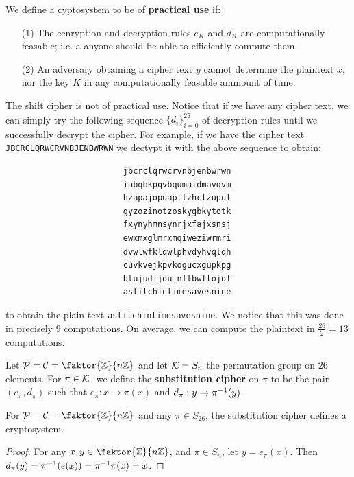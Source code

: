\begin{definition}
    We define a cyptosystem to be of \textbf{practical use} if:
    \begin{enumerate}
        \item[(1)] The ecnryption and decryption rules $e_K$ and  $d_K$ are
            computationally feasable; i.e. a anyone should be able to
            efficiently compute them.

        \item [(2)] An adversary obtaining a cipher text $y$ cannot determine
            the plaintext $x$, nor the key  $K$ in any computationally feasable
            ammount of time.
    \end{enumerate}
\end{definition}

\begin{example}
    The shift cipher is not of practical use. Notice that if we have any cipher
    text, we can simply try the following sequence $\{d_i\}_{i=0}^{25}$ of
    decryption rules until we successfully decrypt the cipher. For example, if
    we have the cipher text \lstinline{JBCRCLQRWCRVNBJENBWRWN} we dectypt it
    with the above sequence to obtain:
    \begin{verbatim}
                        jbcrclqrwcrvnbjenbwrwn
                        iabqbkpqvbqumaidmavqvm
                        hzapajopuaptlzhclzupul
                        gyzozinotzoskygbkytotk
                        fxynyhmnsynrjxfajxsnsj
                        ewxmxglmrxmqiweziwrmri
                        dvwlwfklqwlphvdyhvqlqh
                        cuvkvejkpvkogucxgupkpg
                        btujudijoujnftbwftojof
                        astitchintimesavesnine
    \end{verbatim}
    to obtain the plain text \lstinline{astitchintimesavesnine}. We notice that
    this was done in precisely $9$ computations. On average, we can compute the
    plaintext in $\frac{26}{2}=13$ computations.
\end{example}

\begin{definition}
    Let $\Pc=\Cc=\faktor{\Z}{n\Z}$ and let $\mathcal{K}=S_n$ the permutation group
    on $26$ elements. For $\pi \in \mathcal{K}$, we define the  \textbf{substitution
    cipher} on $\pi$ to be the pair $(e_{\pi}, d_{\pi})$ such that
    $e_{\pi}:x \rightarrow \pi(x)$ and $d_{\pi}:y \rightarrow \pi^{-1}(y)$.
\end{definition}

\begin{theorem}\label{1.2.1}
    For $\Pc=\Cc=\faktor{\Z}{n\Z}$ and any $\pi \in S_{26}$, the substitution
    cipher defines a cryptosystem.
\end{theorem}
\begin{proof}
    For any  $x, y \in \faktor{\Z}{n\Z}$, and $\pi \in S_n$, let
    $y=e_{\pi}(x)$. Then $d_{\pi}(y)=\pi^{-1}(e(x))=\pi^{-1}\pi(x)=x$.
\end{proof}

